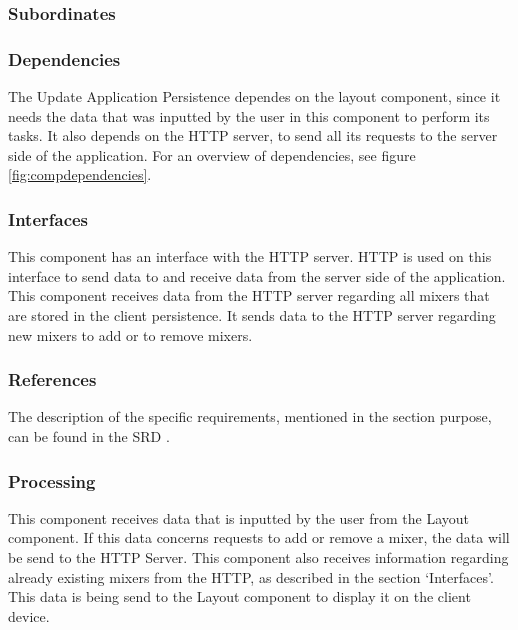 \subsubsection*{Subordinates}

\subsubsection*{Dependencies}
The Update Application Persistence dependes on the layout component, since it needs the data that was inputted by the user in this component to perform its tasks. It also depends on the HTTP server, to send all its requests to the server side of the application. For an overview of dependencies, see figure \ref{fig:compdependencies}.

\subsubsection*{Interfaces}
This component has an interface with the HTTP server. HTTP is used on this interface to send data to and receive data from the server side of the application. This component receives data from the HTTP server regarding all mixers that are stored in the client persistence. It sends data to the HTTP server regarding new mixers to add or to remove mixers.

\subsubsection*{References}
The description of the specific requirements, mentioned in the section purpose, can be found in the SRD \cite{srd}.

\subsubsection*{Processing}
This component receives data that is inputted by the user from the Layout component. If this data concerns requests to add or remove a mixer, the data will be send to the HTTP Server. This component also receives information regarding already existing mixers from the HTTP, as described in the section `Interfaces'. This data is being send to the Layout component to display it on the client device.

